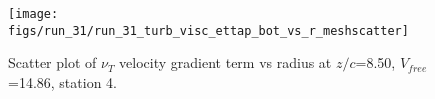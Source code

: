 \begin{figure}[H]
\centering
\texttt{[image: figs/run\_31/run\_31\_turb\_visc\_ettap\_bot\_vs\_r\_meshscatter]}
\caption{Scatter plot of $\nu_T$ velocity gradient term vs radius at $z/c$=8.50, $V_{free}$=14.86, station 4.}
\label{fig:run_31_turb_visc_ettap_bot_vs_r_meshscatter}
\end{figure}


